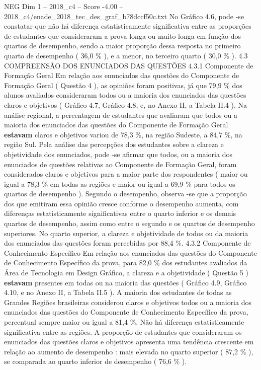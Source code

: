 \begin{textsample}{NEG Dim 1 – 2018\_c4 – Score -4.00 – 2018\_c4/enade\_2018\_tec\_des\_graf\_b78dccf50c.txt}
No Gráfico 4.6, pode -se constatar que não há diferença estatisticamente significativa entre as proporções de estudantes que consideraram a prova longa ou muito longa em função dos quartos de desempenho, sendo a maior proporção dessa resposta no primeiro quarto de desempenho ( 36,0 \% ), e a menor, no terceiro quarto ( 30,0 \% ). 4.3 COMPREENSÃO DOS ENUNCIADOS DAS QUESTÕES 4.3.1 Componente de Formação Geral Em relação aos enunciados das questões do Componente de Formação Geral ( Questão 4 ), as opiniões foram positivas, já que 79,9 \% dos alunos avaliados consideraram todos ou a maioria dos enunciados das questões claros e objetivos ( Gráfico 4.7, Gráfico 4.8, e, no Anexo II, a Tabela II.4 ).
Na análise regional, a percentagem de estudantes que avaliaram que todos ou a maioria dos enunciados das questões do Componente de Formação Geral \textbf{estavam} claros e objetivos variou de 78,3 \%, na região Sudeste, a 84,7 \%, na região Sul.
Pela análise das percepções dos estudantes sobre a clareza e objetividade dos enunciados, pode -se afirmar que todos, ou a maioria dos enunciados de questões relativas ao Componente de Formação Geral, foram considerados claros e objetivos para a maior parte dos respondentes ( maior ou igual a 78,3 \% em todas as regiões e maior ou igual a 69,9 \% para todos os quartos de desempenho ).
Segundo o desempenho, observa -se que a proporção dos que emitiram essa opinião cresce conforme o desempenho aumenta, com diferenças estatisticamente significativas entre o quarto inferior e os demais quartos de desempenho, assim como entre o segundo e os quartos de desempenho superiores.
No quarto superior, a clareza e objetividade de todos ou da maioria dos enunciados das questões foram percebidas por 88,4 \%. 4.3.2 Componente de Conhecimento Específico Em relação aos enunciados das questões do Componente de Conhecimento Específico da prova, para 82,0 \% dos estudantes avaliados da Área de Tecnologia em Design Gráfico, a clareza e a objetividade ( Questão 5 ) \textbf{estavam} presentes em todas ou na maioria das questões ( Gráfico 4.9, Gráfico 4.10, e no Anexo II, a Tabela II.5 ).
A maioria dos estudantes de todas as Grandes Regiões brasileiras considerou claros e objetivos todos ou a maioria dos enunciados das questões do Componente de Conhecimento Específico da prova, percentual sempre maior ou igual a 81,4 \%.
Não há diferença estatisticamente significativa entre as regiões.
A proporção de estudantes que consideraram os enunciados das questões claros e objetivos apresenta uma tendência crescente em relação ao aumento de desempenho : mais elevada no quarto superior ( 87,2 \% ), se comparada ao quarto inferior de desempenho ( 76,6 \% ).

\end{textsample}
